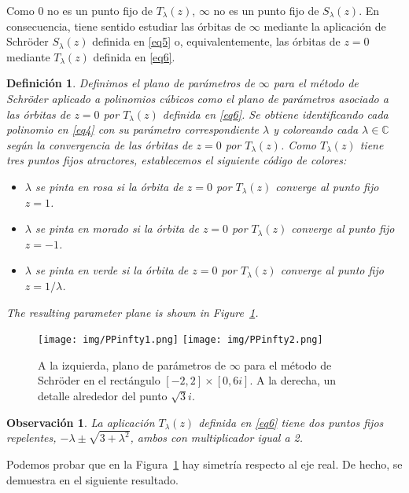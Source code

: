 \IfFileExists{aims.cls}{\documentclass{aims}}{\documentclass[11pt]{article}}
\numberwithin{equation}{section}
\newcommand{\includegraphics}[2][]{%
  }%
\renewcommand{\includegraphics}[2][]{%
  }%
\theoremstyle{thmstyleone}%
\theoremstyle{thmstyletwo}%
\newtheorem{remark}{Observación}
\theoremstyle{thmstylethree}%
\newtheorem{definition}{Definición}%
\begin{document}
Como $0$ no es un punto fijo de $T_{\lambda}(z)$, $\infty$ no es un punto fijo de $S_{\lambda}(z)$. En consecuencia, tiene sentido estudiar las órbitas de $\infty$ mediante la aplicación de Schr\"oder $S_{\lambda}(z)$ definida en \eqref{eq5} o, equivalentemente, las órbitas de $z=0$ mediante $T_{\lambda}(z)$ definida en \eqref{eq6}.

\begin{definition} \label{Def2}
 Definimos el \emph{plano de parámetros de $\infty$ para el método de Schr\"oder aplicado a polinomios cúbicos} como el plano de parámetros asociado a las órbitas de $z=0$ por $T_{\lambda}(z)$ definida en \eqref{eq6}. Se obtiene identificando cada polinomio en \eqref{eq4} con su parámetro correspondiente $\lambda$ y coloreando cada $\lambda\in\mathbb{C}$ según la convergencia de las órbitas de $z=0$ por $T_{\lambda}(z)$. Como $T_{\lambda}(z)$ tiene tres puntos fijos atractores, establecemos el siguiente código de colores:
 \begin{itemize}
\item $\lambda$ se pinta en rosa si la órbita de $z=0$ por $T_{\lambda}(z)$ converge al punto fijo $z=1$.
\item $\lambda$ se pinta en morado si la órbita de $z=0$ por $T_{\lambda}(z)$ converge al punto fijo $z=-1$.
\item $\lambda$ se pinta en verde si la órbita de $z=0$ por $T_{\lambda}(z)$ converge al punto fijo $z=1/\lambda$.
\end{itemize}
The resulting parameter plane is shown in Figure~\ref{fig2}.
\end{definition}

\begin{figure}[h]%
\centering
\texttt{[image: img/PPinfty1.png]}\quad 
\texttt{[image: img/PPinfty2.png]}
\caption{A la izquierda, plano de parámetros de $\infty$ para el método de Schr\"oder en el rectángulo $[-2,2]\times[0,6i]$. A la derecha, un detalle alrededor del punto $\sqrt{3}i$.}\label{fig2}
\end{figure}

\begin{remark}
La aplicación $T_{\lambda}(z)$ definida en \eqref{eq6} tiene dos puntos fijos repelentes, $-\lambda\pm \sqrt{3+\lambda^2}$, ambos con multiplicador igual a 2.
\end{remark}

Podemos probar que en la Figura~\ref{fig2} hay simetría respecto al eje real. De hecho, se demuestra en el siguiente resultado.
\end{document}

